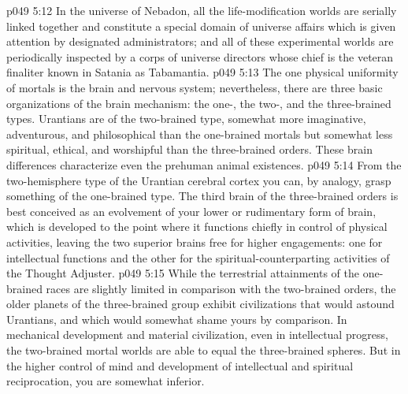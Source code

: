 \vs p049 5:12 In the universe of Nebadon, all the life\hyp{}modification worlds are serially linked together and constitute a special domain of universe affairs which is given attention by designated administrators; and all of these experimental worlds are periodically inspected by a corps of universe directors whose chief is the veteran finaliter known in Satania as Tabamantia.
\vs p049 5:13 \bibnobreakspace {} The one physical uniformity of mortals is the brain and nervous system; nevertheless, there are three basic organizations of the brain mechanism: the one-, the two-, and the three\hyp{}brained types. Urantians are of the two\hyp{}brained type, somewhat more imaginative, adventurous, and philosophical than the one\hyp{}brained mortals but somewhat less spiritual, ethical, and worshipful than the three\hyp{}brained orders. These brain differences characterize even the prehuman animal existences.
\vs p049 5:14 From the two\hyp{}hemisphere type of the Urantian cerebral cortex you can, by analogy, grasp something of the one\hyp{}brained type. The third brain of the three\hyp{}brained orders is best conceived as an evolvement of your lower or rudimentary form of brain, which is developed to the point where it functions chiefly in control of physical activities, leaving the two superior brains free for higher engagements: one for intellectual functions and the other for the spiritual\hyp{}counterparting activities of the Thought Adjuster.
\vs p049 5:15 While the terrestrial attainments of the one\hyp{}brained races are slightly limited in comparison with the two\hyp{}brained orders, the older planets of the three\hyp{}brained group exhibit civilizations that would astound Urantians, and which would somewhat shame yours by comparison. In mechanical development and material civilization, even in intellectual progress, the two\hyp{}brained mortal worlds are able to equal the three\hyp{}brained spheres. But in the higher control of mind and development of intellectual and spiritual reciprocation, you are somewhat inferior.
